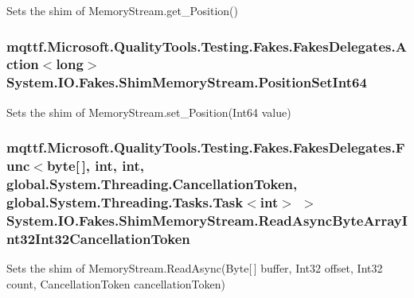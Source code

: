 Sets the shim of Memory\-Stream.\-get\-\_\-\-Position()

\hypertarget{class_system_1_1_i_o_1_1_fakes_1_1_shim_memory_stream_a5877b05ff0205ee89c9a32edafeb6647}{
\subsubsection[{Position\-Set\-Int64}]{\setlength{\rightskip}{0pt plus 5cm}mqttf.\-Microsoft.\-Quality\-Tools.\-Testing.\-Fakes.\-Fakes\-Delegates.\-Action$<$long$>$ System.\-I\-O.\-Fakes.\-Shim\-Memory\-Stream.\-Position\-Set\-Int64\hspace{0.3cm}{\ttfamily [set]}}}\label{class_system_1_1_i_o_1_1_fakes_1_1_shim_memory_stream_a5877b05ff0205ee89c9a32edafeb6647}


Sets the shim of Memory\-Stream.\-set\-\_\-\-Position(\-Int64 value)

\hypertarget{class_system_1_1_i_o_1_1_fakes_1_1_shim_memory_stream_abf3788cbf51fa9012176a84002a72dcb}{
\subsubsection[{Read\-Async\-Byte\-Array\-Int32\-Int32\-Cancellation\-Token}]{\setlength{\rightskip}{0pt plus 5cm}mqttf.\-Microsoft.\-Quality\-Tools.\-Testing.\-Fakes.\-Fakes\-Delegates.\-Func$<$byte\mbox{[}$\,$\mbox{]}, int, int, global.\-System.\-Threading.\-Cancellation\-Token, global.\-System.\-Threading.\-Tasks.\-Task$<$int$>$ $>$ System.\-I\-O.\-Fakes.\-Shim\-Memory\-Stream.\-Read\-Async\-Byte\-Array\-Int32\-Int32\-Cancellation\-Token\hspace{0.3cm}{\ttfamily [set]}}}\label{class_system_1_1_i_o_1_1_fakes_1_1_shim_memory_stream_abf3788cbf51fa9012176a84002a72dcb}


Sets the shim of Memory\-Stream.\-Read\-Async(\-Byte\mbox{[}$\,$\mbox{]} buffer, Int32 offset, Int32 count, Cancellation\-Token cancellation\-Token)

